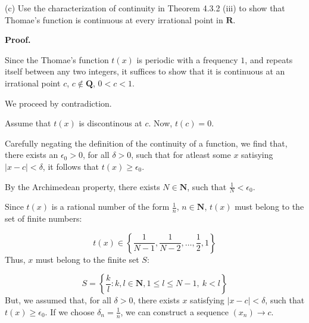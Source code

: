 \documentclass[10pt]{article}
\begin{document}
(c) Use the characterization of continuity in Theorem 4.3.2 (iii) to show that Thomae's function is continuous at every irrational point in $\displaystyle \mathbf{R}$. 



\textbf{Proof.}



Since the Thomae's function $\displaystyle t( x)$ is periodic with a frequency $\displaystyle 1$, and repeats itself between any two integers, it suffices to show that it is continuous at an irrational point $\displaystyle c$, $\displaystyle c\notin \mathbf{Q}$, $\displaystyle 0< c< 1$.



We proceed by contradiction. 



Assume that $\displaystyle t( x)$ is discontinous at $\displaystyle c$. Now, $\displaystyle t( c) =0$. 



Carefully negating the definition of the continuity of a function, we find that, there exists an $\displaystyle \epsilon _{0}  >0$, for all $\displaystyle \delta  >0$, such that for atleast some $\displaystyle x$ satisying $\displaystyle |x-c|< \delta $, it follows that $\displaystyle t( x) \geq \epsilon _{0}$. 



By the Archimedean property, there exists $\displaystyle N\in \mathbf{N}$, such that $\displaystyle \frac{1}{N} < \epsilon _{0}$. 



Since $\displaystyle t( x)$ is a rational number of the form $\displaystyle \frac{1}{n}$, $\displaystyle n\in \mathbf{N}$, $\displaystyle t( x)$ must belong to the set of finite numbers:


\begin{equation*}
t( x) \in \left\{\frac{1}{N-1} ,\frac{1}{N-2} ,\dotsc ,\frac{1}{2} ,1\right\}
\end{equation*}
 Thus, $\displaystyle x$ must belong to the finite set $\displaystyle S$:


\begin{equation*}
S=\left\{\frac{k}{l} :k,l\in \mathbf{N} ,1\leq l\leq N-1,\ k< l\right\}
\end{equation*}
But, we assumed that, for all $\displaystyle \delta  >0$, there exists $\displaystyle x$ satisfying $\displaystyle |x-c|< \delta $, such that $\displaystyle t( x) \geq \epsilon _{0}$. If we choose $\displaystyle \delta _{n} =\frac{1}{n}$, we can construct a sequence $\displaystyle ( x_{n})\rightarrow c$. 
\end{document}
